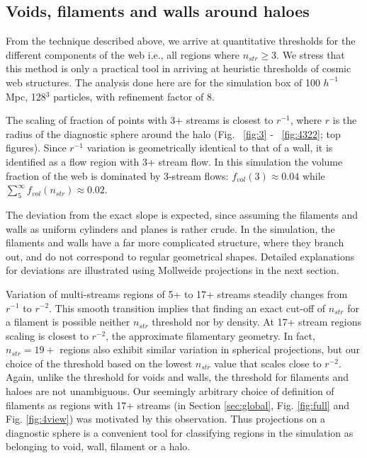 \subsection{Voids, filaments and walls around haloes}

From the technique described  above, we arrive at quantitative thresholds for the different components of the web i.e., all regions where
$n_{str} \ge 3$. We stress that this method is only a practical tool in arriving at heuristic thresholds of cosmic web structures. The analysis done here are for the simulation box of 100 $h^{-1}$ Mpc, 128$^3$ particles, with refinement factor of 8.

The scaling of fraction of points with 3+ streams is closest to $r^{-1}$, where $r$ is the radius of the diagnostic sphere around the halo (Fig. ~\ref{fig:3} - ~\ref{fig:4322}; top figures). Since $r^{-1}$ variation is geometrically identical to that of a wall, it is identified as a flow region with 3+ stream flow. In this simulation the volume fraction of the web is dominated by 3-stream flows: $f_{vol}(3) \approx 0.04$ while
$\sum_5^{\infty} f_{vol}(n_{str}) \approx 0.02$.  

The deviation from the exact slope is expected, since assuming the filaments and walls as uniform cylinders 
and planes is rather crude. In the simulation, the filaments and walls have a far more complicated structure, where they branch out, and do not correspond to regular geometrical shapes. Detailed explanations for deviations are illustrated using Mollweide projections in the next section. 

Variation of multi-streams regions of 5+ to 17+ streams steadily changes from $r^{-1}$ to $r^{-2}$. This smooth transition implies that finding an exact cut-off of $n_{str}$ for  a filament is possible neither $n_{str}$ threshold nor by density. At 17+ stream regions scaling is closest to $r^{-2}$, the approximate filamentary geometry. In fact, $n_{str} = 19+$ regions also exhibit similar variation in spherical projections, but our choice of the threshold based on the lowest $n_{str}$ value that scales close to $r^{-2}$. Again, unlike the threshold for voids and walls, the threshold for filaments and haloes are not unambiguous. Our seemingly arbitrary choice of definition of filaments as regions with 17+ streams (in Section \ref{sec:global}, Fig. \ref{fig:full} and Fig. \ref{fig:4view}) was motivated by this observation. 
Thus projections on a diagnostic sphere is a convenient tool for classifying regions in the simulation as belonging to void, wall, filament or a halo. 

